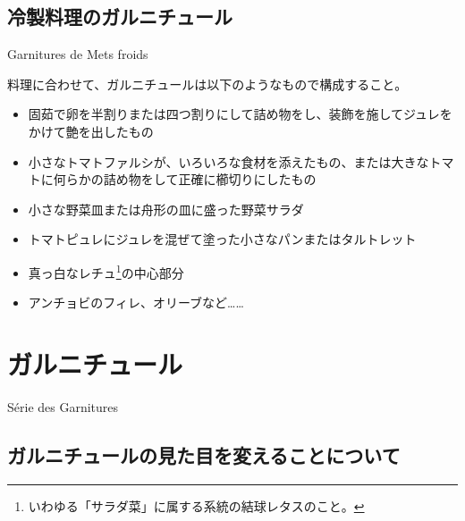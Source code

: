 \begin{main}
\hypertarget{garnitures-de-mets-froids}{%
\subsection{冷製料理のガルニチュール}\label{garnitures-de-mets-froids}}

\begin{frsecbenv}

Garnitures de Mets froids

\end{frsecbenv}


料理に合わせて、ガルニチュールは以下のようなもので構成すること。

\begin{itemize}
\tightlist
\item
  固茹で卵を半割りまたは四つ割りにして詰め物をし、装飾を施してジュレをかけて艶を出したもの
\item
  小さなトマトファルシが、いろいろな食材を添えたもの、または大きなトマトに何らかの詰め物をして正確に櫛切りにしたもの
\item
  小さな野菜皿または舟形の皿に盛った野菜サラダ
\item
  トマトピュレにジュレを混ぜて塗った小さなパンまたはタルトレット
\item
  真っ白なレチュ\footnote{いわゆる「サラダ菜」に属する系統の結球レタスのこと。}の中心部分
\item
  アンチョビのフィレ、オリーブなど\ldots{}\ldots{}
\end{itemize}

\newpage

\hypertarget{serie-des-garnitures}{%
\section{ガルニチュール}\label{serie-des-garnitures}}


\begin{frsecenv}

Série des Garnitures

\end{frsecenv}

\hypertarget{consideration-sur-la-modification-de-forme-que-peuvent-subir-les-garniture}{%
\subsection{ガルニチュールの見た目を変えることについて}\label{consideration-sur-la-modification-de-forme-que-peuvent-subir-les-garniture}}


\end{main}
